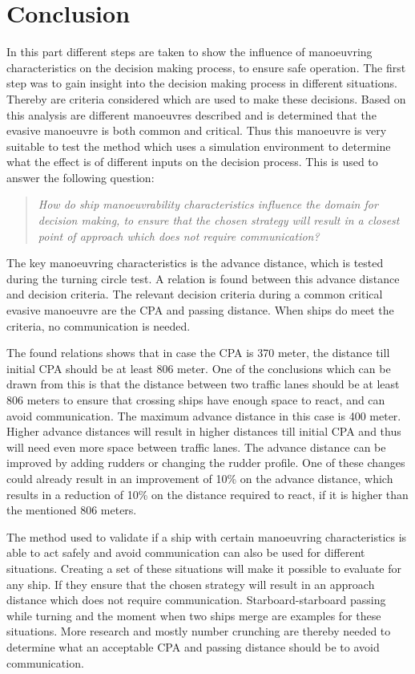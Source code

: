 \chapter{Conclusion}
In this part different steps are taken to show the influence of manoeuvring characteristics on the decision making process, to ensure safe operation. The first step was to gain insight into the decision making process in different situations. Thereby are criteria considered which are used to make these decisions.
Based on this analysis are different manoeuvres described and is determined that the evasive manoeuvre is both common and critical. Thus this manoeuvre is very suitable to test the method which uses a simulation environment to determine what the effect is of different inputs on the decision process. 
This is used to answer the following question:

\begin{quotation}
	\emph{How do ship manoeuvrability characteristics influence the domain for decision making, to ensure that the chosen strategy will result in a closest point of approach which does not require communication?} 
\end{quotation}

The key manoeuvring characteristics is the advance distance, which is tested during the turning circle test. A relation is found between this advance distance and decision criteria. The relevant decision criteria during a common critical evasive manoeuvre are the \acf{CPA} and passing distance. When ships do meet the criteria, no communication is needed.

The found relations shows that in case the \ac{CPA} is 370 meter, the distance till initial CPA should be at least 806 meter. One of the conclusions which can be drawn from this is that the distance between two traffic lanes should be at least 806 meters to ensure that crossing ships have enough space to react, and can avoid communication.
The maximum advance distance in this case is 400 meter. Higher advance distances will result in higher distances till initial CPA and thus will need even more space between traffic lanes. The advance distance can be improved by adding rudders or changing the rudder profile. One of these changes could already result in an improvement of 10\% on the advance distance, which results in a reduction of 10\% on the distance required to react, if it is higher than the mentioned 806 meters. 

The method used to validate if a ship with certain manoeuvring characteristics is able to act safely and avoid communication can also be used for different situations. Creating a set of these situations will make it possible to evaluate for any ship. If they ensure that the chosen strategy will result in an approach distance which does not require communication. Starboard-starboard passing while turning and the moment when two ships merge are examples for these situations. 
More research and mostly number crunching are thereby needed to determine what an acceptable \ac{CPA} and passing distance should be to avoid communication.

